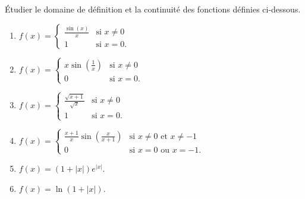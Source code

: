 
\begin{exercice}\label{exoINGE11140032}

	Étudier le domaine de définition et la continuité des fonctions définies ci-dessous.
	\begin{enumerate}

		\item
			$f(x)=\begin{cases}
				\frac{ \sin(x) }{ x }	&	\text{si $x\neq 0$}\\
				1	&	 \text{si $x=0$.}
			\end{cases}
			$
		\item
			$f(x)=\begin{cases}
				x\sin(\frac{1}{ x })	&	\text{si $x\neq 0$}\\
				0	&	 \text{si $x=0$.}
			\end{cases}
			$
		\item
			$f(x)=\begin{cases}
				\frac{ \sqrt{x+1} }{ \sqrt{x} }	&	\text{si $x\neq 0$}\\
				1	&	 \text{si $x=0$.}
			\end{cases}
			$
		\item
			$f(x)=\begin{cases}
				\frac{ x+1 }{ x }\sin(\frac{ x }{ x+1 })	&	\text{si $x\neq 0$ et $x\neq -1$}\\
				0	&	 \text{si $x=0$ ou $x=-1$.}
			\end{cases}
			$
		\item
			$f(x)=(1+| x |) e^{| x |}$.
		\item
			$f(x)=\ln(1+| x |)$.

	\end{enumerate}

\end{exercice}
